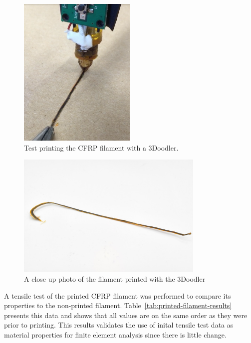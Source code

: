 \begin{figure}[htp]
    \centering
    \includegraphics[width=0.5\textwidth]{./figures/filament-print-3doodler-during}
    \caption{Test printing the CFRP filament with a 3Doodler.}
    \label{fig:filament-print-3doodler-during}
\end{figure}

\begin{figure}[htp]
    \centering
    \includegraphics[width=0.8\textwidth]{./figures/filament-extrude}
    \caption{A close up photo of the filament printed with the 3Doodler}
    \label{fig:filament-extrude}
\end{figure}

A tensile test of the printed CFRP filament was performed to compare its properties to the non-printed filament. Table~\ref{tab:printed-filament-results} presents this data and shows that all values are on the same order as they were prior to printing. This results validates the use of inital tensile test data as material properties for finite element analysis since there is little change.\\

